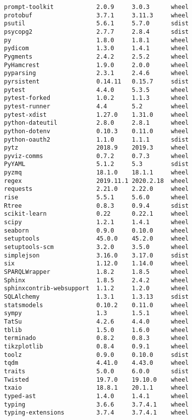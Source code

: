 \documentclass[11pt,a4paper]{article}
\begin{document}
\begin{verbatim}
prompt-toolkit            2.0.9     3.0.3      wheel
protobuf                  3.7.1     3.11.3     wheel
psutil                    5.6.1     5.7.0      sdist
psycopg2                  2.7.7     2.8.4      sdist
py                        1.8.0     1.8.1      wheel
pydicom                   1.3.0     1.4.1      wheel
Pygments                  2.4.2     2.5.2      wheel
PyHamcrest                1.9.0     2.0.0      wheel
pyparsing                 2.3.1     2.4.6      wheel
pyrsistent                0.14.11   0.15.7     sdist
pytest                    4.4.0     5.3.5      wheel
pytest-forked             1.0.2     1.1.3      wheel
pytest-runner             4.4       5.2        wheel
pytest-xdist              1.27.0    1.31.0     wheel
python-dateutil           2.8.0     2.8.1      wheel
python-dotenv             0.10.3    0.11.0     wheel
python-oauth2             1.1.0     1.1.1      sdist
pytz                      2018.9    2019.3     wheel
pyviz-comms               0.7.2     0.7.3      wheel
PyYAML                    5.1.2     5.3        sdist
pyzmq                     18.1.0    18.1.1     wheel
regex                     2019.11.1 2020.2.18  wheel
requests                  2.21.0    2.22.0     wheel
rise                      5.5.1     5.6.0      wheel
Rtree                     0.8.3     0.9.4      sdist
scikit-learn              0.22      0.22.1     wheel
scipy                     1.2.1     1.4.1      wheel
seaborn                   0.9.0     0.10.0     wheel
setuptools                45.0.0    45.2.0     wheel
setuptools-scm            3.2.0     3.5.0      wheel
simplejson                3.16.0    3.17.0     sdist
six                       1.12.0    1.14.0     wheel
SPARQLWrapper             1.8.2     1.8.5      wheel
Sphinx                    1.8.5     2.4.2      wheel
sphinxcontrib-websupport  1.1.2     1.2.0      wheel
SQLAlchemy                1.3.1     1.3.13     sdist
statsmodels               0.10.2    0.11.0     wheel
sympy                     1.3       1.5.1      wheel
TatSu                     4.2.6     4.4.0      wheel
tblib                     1.5.0     1.6.0      wheel
terminado                 0.8.2     0.8.3      wheel
tikzplotlib               0.8.4     0.9.1      wheel
toolz                     0.9.0     0.10.0     sdist
tqdm                      4.41.0    4.43.0     wheel
traits                    5.0.0     6.0.0      sdist
Twisted                   19.7.0    19.10.0    wheel
txaio                     18.8.1    20.1.1     wheel
typed-ast                 1.4.0     1.4.1      wheel
typing                    3.6.6     3.7.4.1    wheel
typing-extensions         3.7.4     3.7.4.1    wheel

\end{verbatim}
\end{document}
